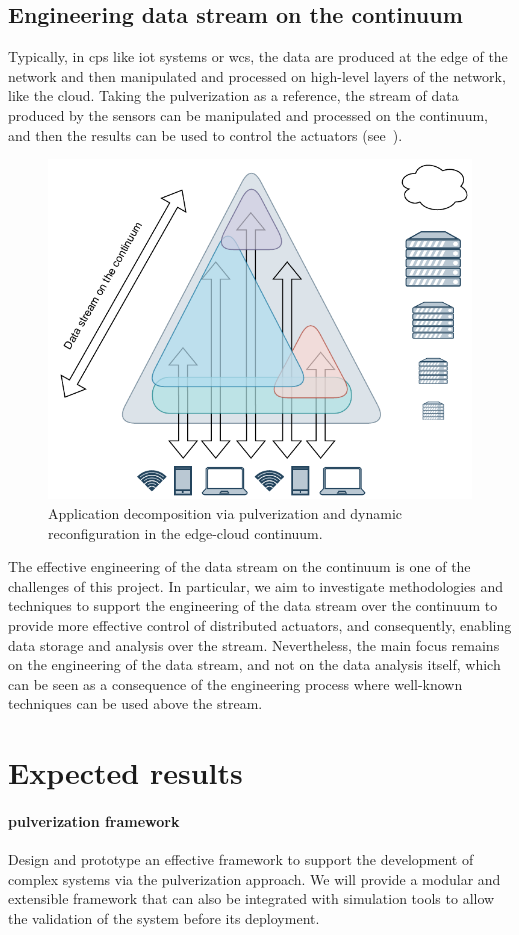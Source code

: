 \documentclass[12pt]{article}
\newcommand{\meta}[1]{{\color{blue}#1}}
\begin{document}
\subsection{Engineering data stream on the continuum}\label{sec:eng-data-stream}
\meta{
Typically,
in \ac{cps} like \ac{iot} systems or \ac{wcs},
the data are produced at the edge of the network and then manipulated and processed on high-level layers of the network, like the cloud.
%
Taking the pulverization as a reference,
the stream of data produced by the sensors can be manipulated and processed on the continuum,
and then the results can be used to control the actuators (see~\Cref{fig:data-stream}).
%
\begin{figure}[ht]
	\centering
	\includegraphics[width=.55\textwidth]{img/data-stream.drawio.pdf}
	\caption{Application decomposition via pulverization and dynamic reconfiguration in the edge-cloud continuum.}
	\label{fig:data-stream}
\end{figure}
%
The effective engineering of the data stream on the continuum is one of the challenges of this project.
%
In particular,
we aim to investigate methodologies and techniques to support the engineering of the data stream over the continuum to provide more effective control of distributed actuators,
and consequently,
enabling data storage and analysis over the stream.
%
Nevertheless,
the main focus remains on the engineering of the data stream,
and not on the data analysis itself,
which can be seen as a consequence of the engineering process where well-known techniques can be used above the stream.
}

\section{Expected results}\label{sec:expected-results}

\paragraph{pulverization framework}
Design and prototype an effective framework to support the development of complex systems
via the pulverization approach.
%
We will provide a modular and extensible framework that can also be integrated with simulation tools
to allow the validation of the system before its deployment.
\end{document}
